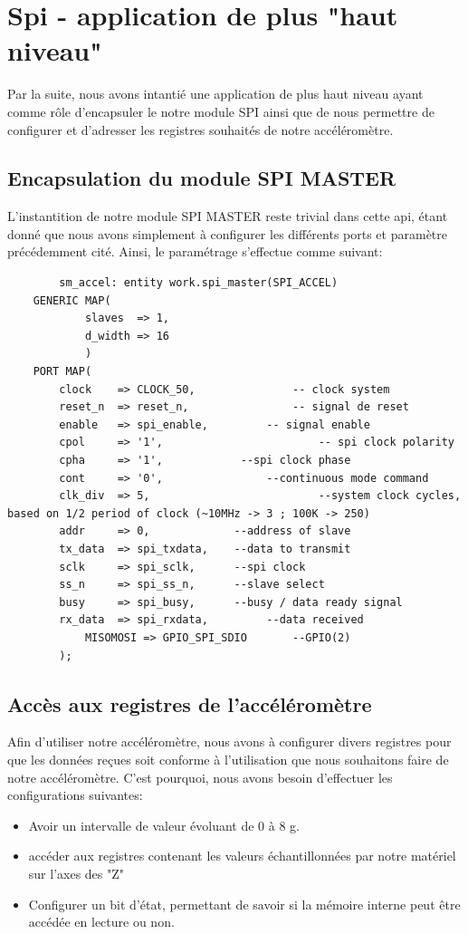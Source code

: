\documentclass[french,a4paper,12pt]{report}
\begin{document}
	\section{Spi - application de plus "haut niveau"}
		Par la suite, nous avons intantié une application de plus haut niveau ayant comme rôle d'encapsuler le notre module SPI ainsi que de nous permettre de configurer et d'adresser les registres souhaités de notre accéléromètre.
		
		\subsection{Encapsulation du module SPI MASTER}
			L'instantition de notre module SPI MASTER reste trivial dans cette api, étant donné que nous avons simplement à configurer les différents ports et paramètre précédemment cité. Ainsi, le paramétrage s'effectue comme suivant:

	\begin{lstlisting}
 		sm_accel: entity work.spi_master(SPI_ACCEL)
  	GENERIC MAP(
   	 		slaves  => 1,
   	 		d_width => 16
	 		)
  	PORT MAP(
    	clock    => CLOCK_50,				-- clock system
    	reset_n  => reset_n,				-- signal de reset
    	enable   => spi_enable,			-- signal enable
    	cpol     => '1',						-- spi clock polarity
    	cpha     => '1',           	--spi clock phase
    	cont     => '0',         		--continuous mode command
    	clk_div  => 5,							--system clock cycles, based on 1/2 period of clock (~10MHz -> 3 ; 100K -> 250)
    	addr     => 0,             --address of slave
    	tx_data  => spi_txdata,    --data to transmit
    	sclk     => spi_sclk,      --spi clock
    	ss_n     => spi_ss_n,      --slave select
    	busy     => spi_busy,      --busy / data ready signal
    	rx_data  => spi_rxdata,			--data received
	 		MISOMOSI => GPIO_SPI_SDIO		--GPIO(2)
		);
		\end{lstlisting}
		
		\subsection{Accès aux registres de l'accéléromètre}
			Afin d'utiliser notre accéléromètre, nous avons à configurer divers registres pour que les données reçues soit conforme à l'utilisation que nous souhaitons faire de notre accéléromètre. C'est pourquoi, nous avons besoin d'effectuer les configurations suivantes:
			
			\begin{itemize}
				\item Avoir un intervalle de valeur évoluant de 0 à 8 g.
				\item accéder aux registres contenant les valeurs échantillonnées par notre matériel sur l'axes des "Z"
				\item Configurer un bit d'état, permettant de savoir si la mémoire interne peut être accédée en lecture ou non.				
			\end{itemize}
			
\end{document}
